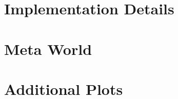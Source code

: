 \chapter{Implementation Details}
\label{chapter:DetailedDescriptions}\label{appendix}

\chapter{Meta World}
\label{chapter:MetaWorld}

\chapter{Additional Plots}
\label{chapter:additional_plots}

